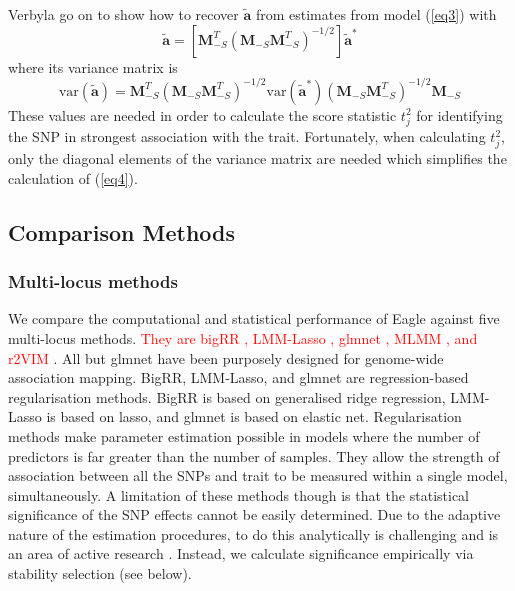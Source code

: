\documentclass{bioinfo}
\newcommand{\bwidetildea}{\widetilde{\bm{a}}}
\newcommand{\bM}{\bm{M}}
\begin{document}
Verbyla \citep{verbyla2012rwgaim,verbyla2014whole} go on to show how to recover $\bwidetildea$ from estimates from model  (\ref{eq3})  with 
\begin{equation}
\bwidetildea = \left [ \bM_{-S}^T (\bM_{-S} \bM_{-S}^T)^{-1/2} \right ] \bwidetildea^*
\end{equation}
where its variance matrix is
\begin{equation}
\label{eq4}
\textrm{var}(\bwidetildea) = \bM_{-S}^T (\bM_{-S} \bM_{-S}^T)^{-1/2} \textrm{var}(\bwidetildea^*) (\bM_{-S} \bM_{-S}^T)^{-1/2} \bM_{-S}
\end{equation}
These values are needed in order to calculate the score statistic $t_j^2$ for identifying the SNP in strongest association with the trait. 
Fortunately, when calculating $t_j^2$, only the diagonal elements of the variance matrix are needed which simplifies the  calculation 
of (\ref{eq4}). 


\subsection{Comparison Methods}

 \subsubsection{ Multi-locus methods} 
 
 We compare the computational and statistical performance of Eagle against five multi-locus methods. \textcolor{red}{They are bigRR  \citep{shen2013novel}, LMM-Lasso \citep{rakitsch2013lasso}, glmnet \citep{Friedman2010glmnet}, 
MLMM \citep{segura2012efficient}, and r2VIM \citep{szymczak2016r2vim}}.  All but glmnet have been purposely designed for genome-wide association mapping. 
BigRR, LMM-Lasso, and glmnet are regression-based regularisation 
methods. BigRR is based on generalised ridge regression, \hbox{LMM-Lasso} is based on lasso, and glmnet is based on elastic net. 
Regularisation methods make parameter estimation possible in models  where the number of predictors is far greater than the number of samples. 
They allow the strength of association between all the SNPs and trait to be measured within a single model, simultaneously. 
A limitation of these methods though is that the statistical significance of the SNP effects cannot be easily determined. 
 Due to the adaptive nature of the estimation procedures, to do this 
analytically is challenging and is an area of active research \citep{lockhart2014significance}. Instead, we calculate significance empirically via 
stability selection (see below). 
\end{document}

